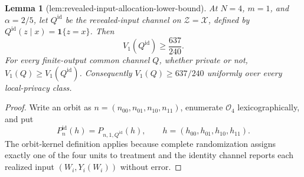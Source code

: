 \documentclass{article}
\newtheorem{lemma}{Lemma}
\begin{document}
\begin{lemma}[lem:revealed-input-allocation-lower-bound]\label{lem:revealed-input-allocation-lower-bound}
At \(N=4\), \(m=1\), and \(\alpha=2/5\), let \(Q^{\mathrm{id}}\) be the revealed-input channel on \(\mathcal Z=\mathcal X\), defined by \(Q^{\mathrm{id}}(z\mid x)=\mathbf 1\{z=x\}\). Then
\[
 V_1(Q^{\mathrm{id}})\ge \frac{637}{240}.
\]
For every finite-output common channel \(Q\), whether private or not, \(V_1(Q)\ge V_1(Q^{\mathrm{id}})\). Consequently \(V_1(Q)\ge637/240\) uniformly over every local-privacy class.
\end{lemma}
\begin{proof}
Write an orbit as \(n=(n_{00},n_{01},n_{10},n_{11})\), enumerate \(\mathcal O_4\) lexicographically, and put
\[
 P^{\mathrm{id}}_n(h)=P_{n,1,Q^{\mathrm{id}}}(h),
 \qquad
 h=(h_{00},h_{01},h_{10},h_{11}).
\]
The orbit-kernel definition applies because complete randomization assigns exactly one of the four units to treatment and the identity channel reports each realized input \((W_i,Y_i(W_i))\) without error.


\end{proof}
\end{document}
